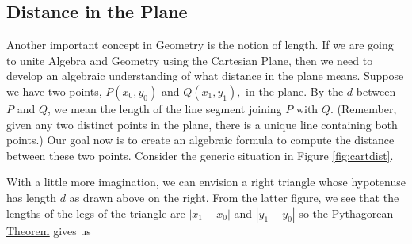 \medskip


\subsection{Distance in the Plane}

Another important concept in Geometry is the notion of length.  If we are going to unite Algebra and Geometry using the Cartesian Plane, then we need to develop an algebraic understanding of what distance in the plane means.  Suppose we have two points, $P\left(x_{0}, y_{0}\right)$ and $Q\left(x_{1}, y_{1}\right),$ in the plane. By the   $d$  between $P$ and $Q$, we mean the length of the line segment joining $P$ with $Q$.  (Remember, given any two distinct points in the plane, there is a unique line containing both points.)  Our goal now is to create an algebraic formula to compute the distance between these two points. Consider the generic situation in Figure \ref{fig:cartdist}.

\medskip


\medskip

With a little more imagination, we can envision a right triangle whose hypotenuse has length $d$ as drawn above on the right.  From the latter figure, we see that the lengths of the legs of the triangle are $\left|x_{1} - x_{0}\right|$ and $\left|y_{1} - y_{0}\right|$ so the \href{http://en.wikipedia.org/wiki/Pythagorean_Theorem}{\underline{Pythagorean Theorem}} gives us
 
